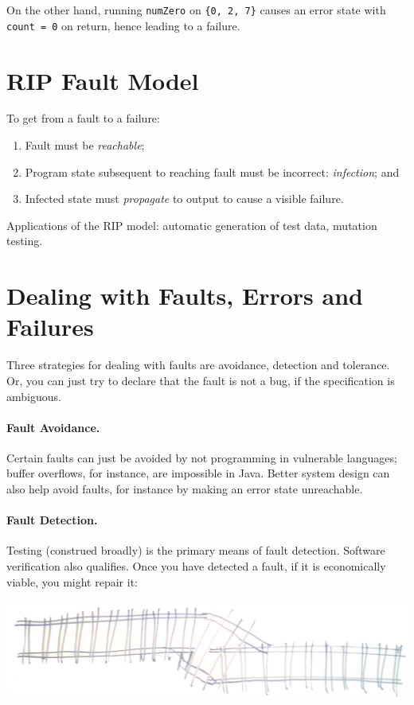 \documentclass[11pt]{article}
\begin{document}
On the other hand, running {\tt numZero} on {\tt \{0, 2, 7\}}
causes an error state with {\tt count = 0} on return, hence leading to a failure.


\section*{RIP Fault Model}
To get from a fault to a failure:
\begin{enumerate}
\item Fault must be \emph{reachable};
\item Program state subsequent to reaching fault must be incorrect: \emph{infection}; and
\item Infected state must \emph{propagate} to output to cause a visible failure.
\end{enumerate}
Applications of the RIP model: automatic generation of test data, mutation testing.

\section*{Dealing with Faults, Errors and Failures}
Three strategies for dealing with faults are avoidance, detection and
tolerance. Or, you can just try to declare that the fault is not
a bug, if the specification is ambiguous.

\paragraph{Fault Avoidance.} Certain faults can just be avoided by
not programming in vulnerable languages; buffer overflows,
for instance, are impossible in Java. Better system design can also
help avoid faults, for instance by making an error state unreachable.

\paragraph{Fault Detection.} Testing (construed broadly)
is the primary means of fault detection. Software verification
also qualifies. Once you have detected a fault, if it is
economically viable, you might repair it:

\begin{center}
  \includegraphics[width=.7\textwidth]{L02/003_patch}
\end{center}
\end{document}
